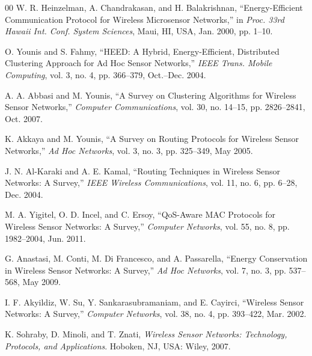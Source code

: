 \documentclass[conference]{IEEEtran}
\begin{document}
\begin{thebibliography}{00}
 W. R. Heinzelman, A. Chandrakasan, and H. Balakrishnan, ``Energy-Efficient Communication Protocol for Wireless Microsensor Networks,'' in \textit{Proc. 33rd Hawaii Int. Conf. System Sciences}, Maui, HI, USA, Jan. 2000, pp. 1--10.

 O. Younis and S. Fahmy, ``HEED: A Hybrid, Energy-Efficient, Distributed Clustering Approach for Ad Hoc Sensor Networks,'' \textit{IEEE Trans. Mobile Computing}, vol. 3, no. 4, pp. 366--379, Oct.--Dec. 2004.

 A. A. Abbasi and M. Younis, ``A Survey on Clustering Algorithms for Wireless Sensor Networks,'' \textit{Computer Communications}, vol. 30, no. 14--15, pp. 2826--2841, Oct. 2007.

 K. Akkaya and M. Younis, ``A Survey on Routing Protocols for Wireless Sensor Networks,'' \textit{Ad Hoc Networks}, vol. 3, no. 3, pp. 325--349, May 2005.

 J. N. Al-Karaki and A. E. Kamal, ``Routing Techniques in Wireless Sensor Networks: A Survey,'' \textit{IEEE Wireless Communications}, vol. 11, no. 6, pp. 6--28, Dec. 2004.

 M. A. Yigitel, O. D. Incel, and C. Ersoy, ``QoS-Aware MAC Protocols for Wireless Sensor Networks: A Survey,'' \textit{Computer Networks}, vol. 55, no. 8, pp. 1982--2004, Jun. 2011.

 G. Anastasi, M. Conti, M. Di Francesco, and A. Passarella, ``Energy Conservation in Wireless Sensor Networks: A Survey,'' \textit{Ad Hoc Networks}, vol. 7, no. 3, pp. 537--568, May 2009.

 I. F. Akyildiz, W. Su, Y. Sankarasubramaniam, and E. Cayirci, ``Wireless Sensor Networks: A Survey,'' \textit{Computer Networks}, vol. 38, no. 4, pp. 393--422, Mar. 2002.

 K. Sohraby, D. Minoli, and T. Znati, \textit{Wireless Sensor Networks: Technology, Protocols, and Applications}. Hoboken, NJ, USA: Wiley, 2007.

\end{thebibliography}
\end{document}
